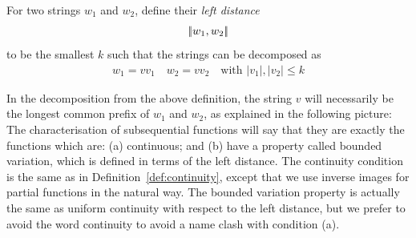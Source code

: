 \begin{definition}\label{def:left-distance}
   For two strings $w_1$ and $w_2$, define their \emph{left distance} 
    \begin{align*}
    |\!|  w_1, w_2 |\!|
    \end{align*}
    to be the smallest $k$ such that the strings can be decomposed as 
    \begin{align*}
    w_1 = v v_1 \quad w_2 = v v_2 \quad \text{with $|v_1|,|v_2| \leq k$}
    \end{align*}
\end{definition}
In the decomposition from the above definition, the string $v$ will necessarily be the longest common prefix of $w_1$ and $w_2$, as explained in the following picture:
The characterisation of subsequential functions will say that they are exactly the functions which are: (a) continuous; and (b) have a property called bounded variation, which is defined in terms of the left distance. The continuity condition is the same as in Definition~\ref{def:continuity}, except that we use inverse images for partial functions in the natural way. The bounded variation property is actually the same as uniform continuity with respect to the left distance, but we prefer to avoid the word continuity to avoid a name clash with condition (a).


